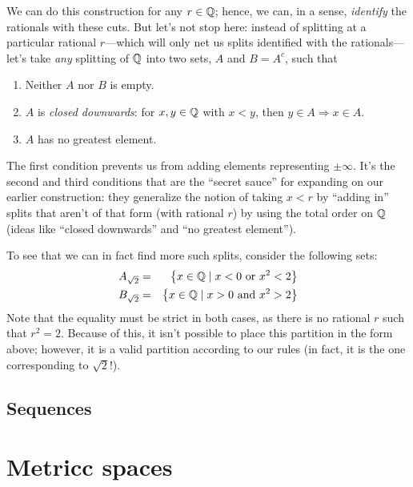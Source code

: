 We can do this construction for any $r \in \mathbb{Q}$; hence, we can, in a sense, \emph{identify} the rationals with these cuts. But let's not stop here: instead of splitting at a particular rational $r$---which will only net us splits identified with the rationals---let's take \emph{any} splitting of $\mathbb{Q}$ into two sets, $A$ and $B = A^c$, such that
\begin{enumerate}
    \item Neither $A$ nor $B$ is empty.
    \item $A$ is \emph{closed downwards}: for $x,y \in \mathbb{Q}$ with $x < y$, then $y \in A \Rightarrow x \in A$.
    \item $A$ has no greatest element.
\end{enumerate}

The first condition prevents us from adding elements representing $\pm \infty$. It's the second and third conditions that are the ``secret sauce'' for expanding on our earlier construction: they generalize the notion of taking $x < r$ by ``adding in'' splits that aren't of that form (with rational $r$) by using the total order on $\mathbb{Q}$ (ideas like ``closed downwards'' and ``no greatest element'').

To see that we can in fact find more such splits, consider the following sets:
\begin{eqnarray}
    A_{\sqrt{2}} & = & \left\{ x \in \mathbb{Q} \mid x < 0 \textrm{ or } x^2 < 2  \right\} \\
    B_{\sqrt{2}} & = & \left\{ x \in \mathbb{Q} \mid x > 0 \textrm{ and } x^2 > 2  \right\}
\end{eqnarray}
Note that the equality must be strict in both cases, as there is no rational $r$ such that $r^2 = 2$. Because of this, it isn't possible to place this partition in the form above; however, it is a valid partition according to our rules (in fact, it is the one corresponding to $\sqrt{2}$!).

\subsection{Sequences}



\section{Metricc spaces}

